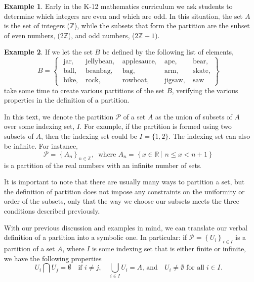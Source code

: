 \documentclass[
]{book}
\theoremstyle{definition}
\theoremstyle{definition}
\newtheorem{example}{Example}[chapter]
\theoremstyle{definition}
\theoremstyle{definition}
\theoremstyle{remark}
\begin{document}
\begin{example}
Early in the K-12 mathematics curriculum we ask students to determine which integers are even and which are odd. In this situation, the set \(A\) is the set of integers (\(\mathbb{Z}\)), while the subsets that form the partition are the subset of even numbers, (\(2\mathbb{Z}\)), and odd numbers, (\(2\mathbb{Z}+1\)).
\end{example}

\begin{example}
If we let the set \(B\) be defined by the following list of elements,
\[B = \begin{Bmatrix} 
\mbox{ jar},  & \mbox{ jellybean} ,  & \mbox{ applesauce}, & \mbox{ ape}, & \mbox{ bear}, \\
\mbox{ ball}, & \mbox{ beanbag}, & \mbox{ bag}, & \mbox{ arm} , & \mbox{ skate} , \\
\mbox{ bike}, & \mbox{ rock}, & \mbox{ rowboat},   &  \mbox{ jigsaw}, & \mbox{ saw}
 \end{Bmatrix}\]
take some time to create various partitions of the set \(B\), verifying the various properties in the definition of a partition.
\end{example}

In this text, we denote the partition \(\mathcal{P}\) of a set \(A\) as the union of subsets of \(A\) over some indexing set, \(I\). For example, if the partition is formed using two subsets of \(A\), then the indexing set could be \(I=\{1,2\}\). The indexing set can also be infinite. For instance,
\[\mathcal{P} = \left\{ A_n  \right\}_{n\in \mathbb{Z}}, \: \mbox{ where } A_n=\left\{x\in \mathbb{R}\middle \vert n\leq x < n+1  \right\}\] is a partition of the real numbers with an infinite number of sets.

It is important to note that there are usually many ways to partition a set, but the definition of partition does not impose any constraints on the uniformity or order of the subsets, only that the way we choose our subsets meets the three conditions described previously.

With our previous discussion and examples in mind, we can translate our verbal definition of a partition into a symbolic one. In particular: if \(\mathcal{P}= \left\{ U_i\right\}_{i\in I}\) is a partition of a set \(A\), where \(I\) is some indexing set that is either finite or infinite, we have the following properties
\[U_i \bigcap U_j = \emptyset \quad \mbox{if } i\neq j, \quad \bigcup_{i\in I} U_i = A \mbox{, and} \quad U_i \neq \emptyset \mbox{ for all } i \in I.\]
\end{document}
